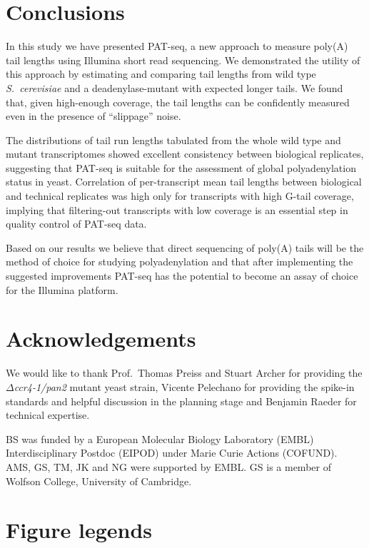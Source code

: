 \documentclass[10pt]{article}
\begin{document}
\section*{Conclusions}

In this study we have presented PAT-seq, a new approach to measure poly(A) tail lengths using Illumina short read sequencing. We demonstrated the utility of this approach by estimating and comparing tail lengths from wild type \textit{S.~cerevisiae} and a deadenylase-mutant with expected longer tails. We found that, given high-enough coverage, the tail lengths can be confidently measured even in the presence of ``slippage'' noise.

The distributions of tail run lengths tabulated from the whole wild type and mutant transcriptomes showed excellent consistency between biological replicates, suggesting that PAT-seq is suitable for the assessment of global polyadenylation status in yeast.
Correlation of per-transcript mean tail lengths between biological and technical replicates was high only for transcripts with high G-tail coverage, implying that filtering-out transcripts with low coverage is an essential step in quality control of PAT-seq data.

Based on our results we believe that direct sequencing of poly(A) tails will be the method of choice for studying polyadenylation and that after implementing the suggested improvements PAT-seq has the potential to become an assay of choice for the Illumina platform.
\section*{Acknowledgements}

We would like to thank Prof.\ Thomas Preiss and Stuart Archer for providing the \textit{$\Delta$ccr4-1/pan2} mutant yeast strain, Vicente Pelechano for providing the spike-in standards and helpful discussion in the planning stage and Benjamin Raeder for technical expertise.

BS was funded by a European Molecular Biology Laboratory (EMBL) Interdisciplinary Postdoc (EIPOD) under Marie Curie Actions (COFUND). AMS, GS, TM, JK and NG were supported by EMBL.  GS is a member of Wolfson College, University of Cambridge.

 
\section*{Figure legends}
\end{document}
